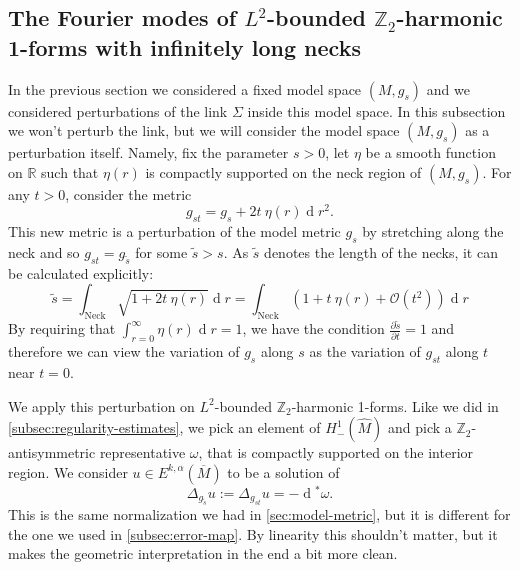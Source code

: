 \documentclass[preprint,12pt]{elsarticle}
\numberwithin{table}{section}
\newcommand{\Z}{\mathbb{Z}}
\newcommand{\R}{\mathbb{R}}
\newcommand{\del}{\partial}
\renewcommand{\d}{\operatorname{d}\!}
\renewcommand{\O}{\mathcal{O}}
\begin{document}
\subsection{The Fourier modes of $L^2$-bounded $\Z_2$-harmonic 1-forms with infinitely long necks}
\label{subsec:limit-of-fourier-modes}
In the previous section we considered a fixed model space $(M, g_s)$ and we considered perturbations of the link $\Sigma$ inside this model space. In this subsection we won't perturb the link, but we will consider the model space $(M, g_s)$ as a perturbation itself. Namely, fix the parameter $s > 0$, let $\eta$ be a smooth function on $\R$ such that $\eta(r)$ is compactly supported on the neck region of $(M, g_s)$. For any $t > 0$, consider the metric
\begin{equation}
	\label{eq:limit:def-g_st}
	g_{st} = g_s + 2 t \: \eta(r) \d r^2.
\end{equation}
This new metric is a perturbation of the model metric $g_s$ by stretching along the neck and so $g_{st} = g_{\tilde s}$ for some $\tilde s > s$.
As $\tilde s$ denotes the length of the necks, it can be calculated explicitly:
$$
\tilde s = \int_{\mathrm{Neck}} \sqrt{1 + 2 t \: \eta(r)} \d r 
= \int_{\mathrm{Neck}} (1 + t \: \eta(r) + \O(t^2)) \d r
$$
By requiring that $\int_{r=0}^\infty \eta(r) \d r = 1$, we have the condition $\frac{\del \tilde s}{\del t} =1$ and therefore we can view the variation of $g_s$ along $s$ as the variation of $g_{st}$ along $t$ near $t =0$.

We apply this perturbation on $L^2$-bounded $\Z_2$-harmonic 1-forms.
Like we did in \cref{subsec:regularity-estimates}, we pick an element of $H^1_-(\hat M)$ and pick a $\Z_2$-antisymmetric representative $\omega$, that is compactly supported on the interior region. We consider $u \in E^{k, \alpha}(\overline M)$ to be a solution of 
$$
\Delta_{g_{\tilde s}} u := \Delta_{g_{st}} u = - \d^* \omega.
$$
This is the same normalization we had in \cref{sec:model-metric}, but it is different for the one we used in \cref{subsec:error-map}. By linearity this shouldn't matter, but it makes the geometric interpretation in the end a bit more clean.
\end{document}
